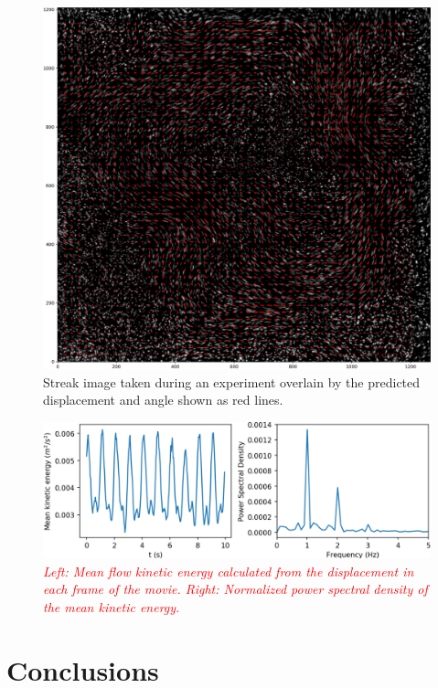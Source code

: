 \documentclass{svjour3}                     %
\newcommand{\new}[1]{\textit{\textcolor{red}{#1}}}
\begin{document}
\begin{figure}
\includegraphics[width=\textwidth]{figs/figure9.png}
\caption{Streak image taken during an experiment overlain by the predicted displacement and angle shown as red lines.}
\label{fig:fig10}
\end{figure}


\begin{figure}
	\includegraphics[width=\textwidth]{figs/figure_libration.png}
	\caption{\new{Left: Mean flow kinetic energy calculated from the displacement in each frame of the movie. Right: Normalized power spectral density of the mean kinetic energy.}}
	\label{fig:time_series}
\end{figure}


\section{Conclusions}
\end{document}
